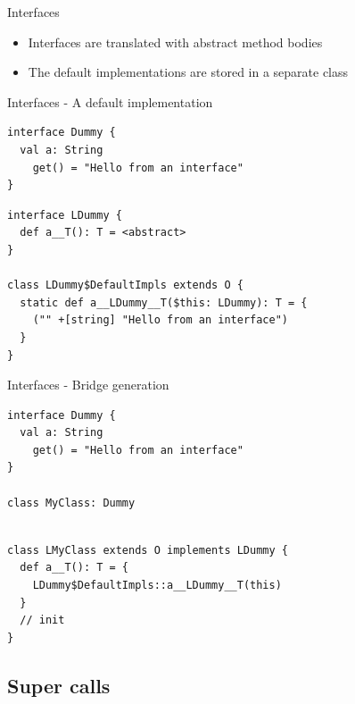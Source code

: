 \documentclass[10pt,usenames,dvipsnames]{beamer}
\begin{document}
\begin{frame}{Interfaces}
  \begin{itemize}
   \item Interfaces are translated with abstract method bodies
   \item The default implementations are stored in a separate class
  \end{itemize}

\end{frame}

\begin{frame}[fragile]{Interfaces - A default implementation}
 \begin{verbatim}
interface Dummy {
  val a: String
    get() = "Hello from an interface"
}
 \end{verbatim}
 
 \begin{verbatim}
interface LDummy {
  def a__T(): T = <abstract>
}

class LDummy$DefaultImpls extends O {
  static def a__LDummy__T($this: LDummy): T = {
    ("" +[string] "Hello from an interface")
  }
}
 \end{verbatim}


\end{frame}


\begin{frame}[fragile]{Interfaces - Bridge generation}

 \begin{verbatim}
interface Dummy {
  val a: String
    get() = "Hello from an interface"
}

class MyClass: Dummy
 \end{verbatim}
 
 \begin{verbatim}

class LMyClass extends O implements LDummy {
  def a__T(): T = {
    LDummy$DefaultImpls::a__LDummy__T(this)
  }
  // init
}
 \end{verbatim}
 
\end{frame}


\subsection{Super calls}
\end{document}
